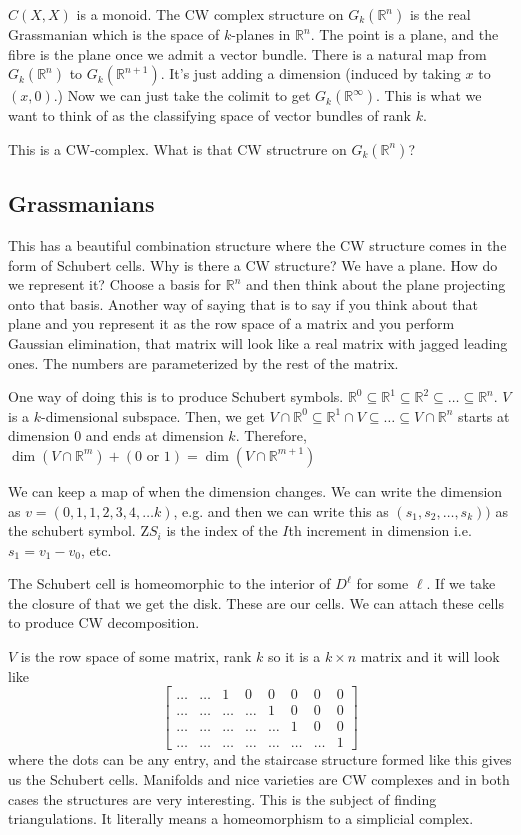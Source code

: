 \documentclass[12pt]{article}
\theoremstyle{definition}
\begin{document}
	$C(X,X)$ is a monoid. The CW complex structure on $G_k(\mathbb{R}^n)$ is the real Grassmanian which is the space of $k$-planes in $\mathbb{R}^n$.  The point is a plane, and the fibre is the plane once we admit a vector bundle. There is a natural map from $G_k(\mathbb{R}^n)$ to $G_k(\mathbb{R}^{n+1})$. It's just adding a dimension (induced by taking $x$ to $(x,0)$.) Now we can just take the colimit to get $G_k(\mathbb{R}^\infty)$. This is what we want to think of as the classifying space of vector bundles of rank $k$. 
	
	This is a CW-complex. What is that CW structrure on $G_k(\mathbb{R}^n)$?
	
	\subsection{Grassmanians}
	This has a beautiful combination structure where the CW structure comes in the form of Schubert cells. Why is there a CW structure? We have a plane. How do we represent it? Choose a basis for $\mathbb{R}^n$ and then think about the plane projecting onto that basis. Another way of saying that is to say if you think about that plane and you represent it as the row space of a matrix and you perform Gaussian elimination, that matrix will look like a real matrix with jagged leading ones. The numbers are parameterized by the rest of the matrix. 
	
	One way of doing this is to produce Schubert symbols. $\mathbb{R}^0\subseteq \mathbb{R}^1\subseteq \mathbb{R}^2\subseteq \dots \subseteq \mathbb{R}^n$.  $V$ is a $k$-dimensional subspace. Then, we get $V\cap \mathbb{R}^0\subseteq \mathbb{R}^1\cap V\subseteq \dots \subseteq V\cap \mathbb{R}^n$ starts at dimension $0$ and ends at dimension $k$. Therefore, $\dim(V\cap \mathbb{R}^m)+(0\text{ or }1)=\dim(V\cap \mathbb{R}^{m+1})$
	
	We can keep a map of when the dimension changes. We can write the dimension as $v=(0,1,1,2,3,4,\dots k)$, e.g. and then we can write this as $(s_1,s_2,\dots ,s_k))$ as the schubert symbol. Z$S_i$ is the index of the $I$th increment in dimension i.e. $s_1=v_1-v_0$, etc.
	
	The Schubert cell is homeomorphic to the interior of $D^\ell$ for some $\ell$. If we take the closure of that we get the disk. These are our cells. We can attach these cells to produce CW decomposition. 
	
	$V$ is the row space of some matrix, rank $k$ so it is a $k\times n$ matrix and it will look like \[
	\begin{bmatrix}
	\dots & \dots & 1 & 0 & 0 & 0 & 0 & 0 \\
	\dots & \dots & \dots & \dots & 1 & 0 & 0 & 0 \\
	\dots & \dots & \dots & \dots & \dots & 1 & 0 & 0\\
	\dots & \dots & \dots & \dots & \dots & \dots & \dots & 1 
	\end{bmatrix}
	\]
	where the dots can be any entry, and the staircase structure formed like this gives us the Schubert cells. Manifolds and nice varieties are CW complexes and in both cases the structures are very interesting. This is the subject of finding triangulations. It literally means a homeomorphism to a simplicial complex. 
	
\end{document}
